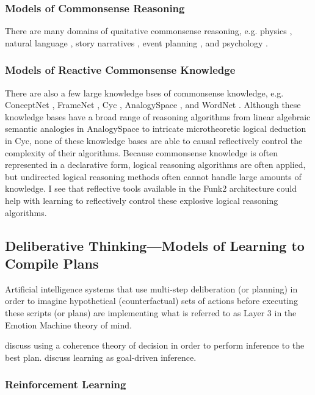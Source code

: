 \subsubsection{Models of Commonsense Reasoning}

There are many domains of quaitative commonsense reasoning, e.g. physics \cite[]{forbus:1994}, natural language \cite[]{liu:2004b}, story narratives \cite[]{williams:2005}, event planning \cite[]{smith:2006}, and psychology \cite[]{gordon:2008}.

\subsubsection{Models of Reactive Commonsense Knowledge}

There are also a few large knowledge bses of commonsense knowledge, e.g. ConceptNet \cite[]{liu:2004a}, FrameNet \cite[]{baker:1998}, Cyc \cite[]{lenat:1990}, AnalogySpace \cite[]{speer:2009}, and WordNet \cite[]{fellbaum:1998}.
Although these knowledge bases have a broad range of reasoning algorithms from linear algebraic semantic analogies in AnalogySpace to intricate microtheoretic logical deduction in Cyc, none of these knowledge bases are able to causal reflectively control the complexity of their algorithms.
Because commonsense knowledge is often represented in a declarative form, logical reasoning algorithms are often applied, but undirected logical reasoning methods often cannot handle large amounts of knowledge.
I see that reflective tools available in the Funk2 architecture could help with learning to reflectively control these explosive logical reasoning algorithms.

\subsection{Deliberative Thinking---Models of Learning to Compile Plans}

Artificial intelligence systems that use multi-step deliberation (or planning) in order to imagine hypothetical (counterfactual) sets of actions before executing these scripts (or plans) are implementing what is referred to as Layer 3 in the Emotion Machine theory of mind.

\cite{thagard:1995} discuss using a coherence theory of decision in order to perform inference to the best plan.
\cite{michalski:1995} discuss learning as goal-driven inference.

\subsubsection{Reinforcement Learning}

